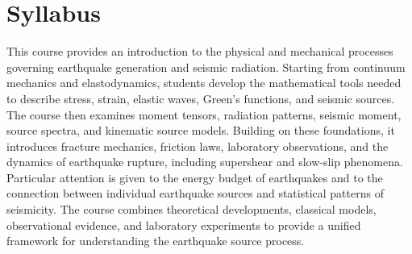
\section*{Syllabus}

This course provides an introduction to the physical and mechanical processes governing earthquake generation and seismic radiation. Starting from continuum mechanics and elastodynamics, students develop the mathematical tools needed to describe stress, strain, elastic waves, Green's functions, and seismic sources. The course then examines moment tensors, radiation patterns, seismic moment, source spectra, and kinematic source models. Building on these foundations, it introduces fracture mechanics, friction laws, laboratory observations, and the dynamics of earthquake rupture, including supershear and slow-slip phenomena. Particular attention is given to the energy budget of earthquakes and to the connection between individual earthquake sources and statistical patterns of seismicity. The course combines theoretical developments, classical models, observational evidence, and laboratory experiments to provide a unified framework for understanding the earthquake source process.


%
%

